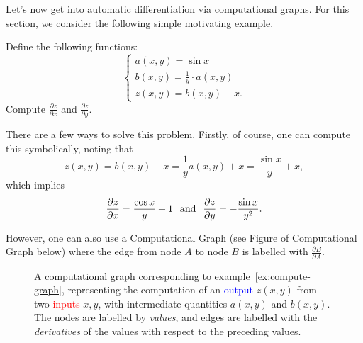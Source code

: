 Let's now get into automatic differentiation via computational graphs.  For this section, we consider the following simple motivating example.

\begin{example}
    \label{ex:compute-graph}
    Define the following functions: 
    \[
    \begin{cases}
        a(x,y) = \sin x \\
        b(x,y) = \frac{1}{y}\cdot a(x,y) \\
        z(x,y) = b(x,y) + x.
    \end{cases}
    \]
    Compute $\frac{\partial z}{\partial x}$ and $\frac{\partial z}{\partial y}.$
\end{example}

There are a few ways to solve this problem. Firstly, of course, one can compute this symbolically, noting that 
\[
z(x,y) = b(x,y) + x = \frac{1}{y} a(x,y) + x = \frac{\sin x}{y} + x,
\]
which implies 
\[
\frac{\partial z}{\partial x} = \frac{\cos x}{y} + 1 \hspace{.25cm} \text{and} \hspace{.25cm} \frac{\partial z}{\partial y} = -\frac{\sin x}{y^2}.
\]

However, one can also use a Computational Graph (see Figure of Computational Graph below) where the edge from node $A$ to node $B$ is labelled with $\frac{\partial B}{\partial A}$.

\begin{figure}[ht]
\begin{center}
\caption{A computational graph corresponding to example~\ref{ex:compute-graph}, representing the computation of an \textcolor{blue}{output} $z(x,y)$ from two \textcolor{red}{inputs} $x,y$, with intermediate quantities $a(x,y)$ and $b(x,y)$.  The nodes are labelled by \emph{values}, and edges are labelled with the \emph{derivatives} of the values with respect to the preceding values.}
\end{center}
\end{figure}
\noindent

